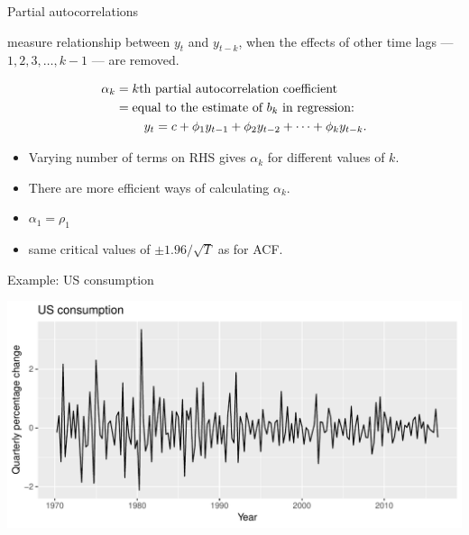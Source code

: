 \documentclass[14pt,ignorenonframetext,]{beamer}
\providecommand{\tightlist}{%
  \setlength{\itemsep}{0pt}\setlength{\parskip}{0pt}}
\begin{document}
\begin{frame}{Partial autocorrelations}

 measure relationship\newline
between \(y_{t}\) and \(y_{t - k}\), when the effects of other time lags
--- \(1, 2, 3, \dots, k - 1\) --- are removed.\pause

\begin{block}{}
\begin{align*}
\alpha_k&= \text{$k$th partial autocorrelation coefficient}\\
&= \text{equal to the estimate of $b_k$ in regression:}\\
& \hspace*{0.8cm} y_t = c + \phi_1 y_{t-1} + \phi_2 y_{t-2} + \dots + \phi_k y_{t-k}.
\end{align*}
\end{block}

\pause

\begin{itemize}
\tightlist
\item
  Varying number of terms on RHS gives \(\alpha_k\) for different values
  of \(k\).
\item
  There are more efficient ways of calculating \(\alpha_k\).
\item
  \(\alpha_1=\rho_1\)
\item
  same critical values of \(\pm 1.96/\sqrt{T}\) as for ACF.
\end{itemize}

\end{frame}

\begin{frame}{Example: US consumption}

\includegraphics{week_5_arima_files/figure-beamer/unnamed-chunk-28-1.pdf}

\end{frame}
\end{document}
